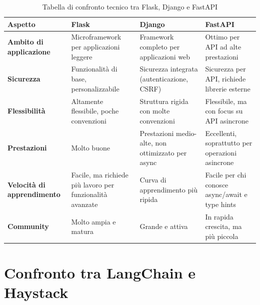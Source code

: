 \documentclass{article}
\begin{document}
\begin{table}[H]
    \renewcommand{\arraystretch}{1.7}
    \centering
    \begin{tabular}{|p{2.55cm}|p{4cm}|p{4cm}|p{4cm}|}
        \hline
        \textbf{Aspetto} & \textbf{\large Flask} & \textbf{\large Django} & \textbf{\large FastAPI} \\
        \hline
        \textbf{Ambito di applicazione} & Microframework per applicazioni leggere & Framework completo per applicazioni web & Ottimo per API ad alte prestazioni \\
        \hline
        \textbf{Sicurezza} & Funzionalità di base, personalizzabile & Sicurezza integrata (autenticazione, CSRF) & Sicurezza per API, richiede librerie esterne \\
        \hline
        \textbf{Flessibilità} & Altamente flessibile, poche convenzioni & Struttura rigida con molte convenzioni & Flessibile, ma con focus su API asincrone \\
        \hline
        \textbf{Prestazioni} & Molto buone & Prestazioni medio-alte, non ottimizzato per async & Eccellenti, soprattutto per operazioni asincrone \\
        \hline
        \textbf{Velocità di apprendimento} & Facile, ma richiede più lavoro per funzionalità avanzate & Curva di apprendimento più ripida & Facile per chi conosce async/await e type hints \\
        \hline
        \textbf{Community} & Molto ampia e matura & Grande e attiva & In rapida crescita, ma più piccola \\
        \hline
    \end{tabular}
    \caption{Tabella di confronto tecnico tra Flask, Django e FastAPI}
\end{table}

\section{Confronto tra LangChain e Haystack}
\end{document}
